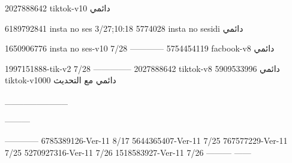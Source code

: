 2027888642 tiktok-v10
دائمي

6189792841 insta no ses
3/27;10:18
5774028 insta no sesidi
دائمي

1650906776 insta no ses-v10
7/28
------------
5754454119 facbook-v8
دائمي

1997151888-tik-v2
7/28
--------------
2027888642 tiktok-v8
دائمي
5909533996 tiktok-v1000
دائمي مع التحديث

__________

---------

------------
6785389126-Ver-11
8/17
5644365407-Ver-11
7/25
767577229-Ver-11
7/25
5270927316-Ver-11
7/26
1518583927-Ver-11
7/26
---------
------
